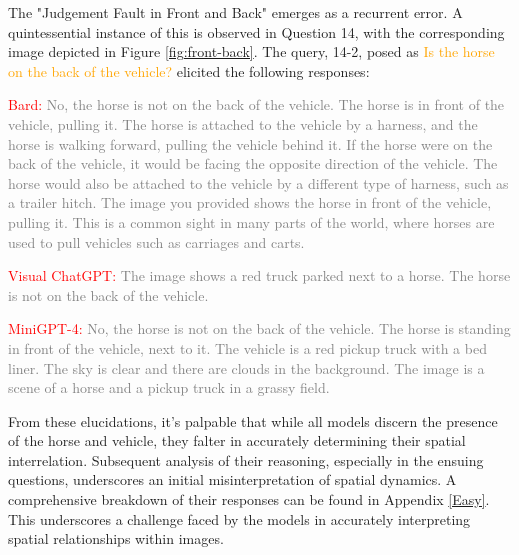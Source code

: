 \documentclass[journal,10pt]{IEEEtran}
\begin{document}
The "Judgement Fault in Front and Back" emerges as a recurrent error. A quintessential instance of this is observed in Question 14, with the corresponding image depicted in Figure \ref{fig:front-back}. The query, 14-2, posed as \textcolor{orange}{Is the horse on the back of the vehicle?} elicited the following responses:

\textcolor{red}{Bard:} \textcolor{gray}{No, the horse is not on the back of the vehicle. The horse is in front of the vehicle, pulling it. The horse is attached to the vehicle by a harness, and the horse is walking forward, pulling the vehicle behind it. If the horse were on the back of the vehicle, it would be facing the opposite direction of the vehicle. The horse would also be attached to the vehicle by a different type of harness, such as a trailer hitch. The image you provided shows the horse in front of the vehicle, pulling it. This is a common sight in many parts of the world, where horses are used to pull vehicles such as carriages and carts.}

\textcolor{red}{Visual ChatGPT:} \textcolor{gray}{The image shows a red truck parked next to a horse. The horse is not on the back of the vehicle.}

\textcolor{red}{MiniGPT-4:} \textcolor{gray}{No, the horse is not on the back of the vehicle. The horse is standing in front of the vehicle, next to it. The vehicle is a red pickup truck with a bed liner. The sky is clear and there are clouds in the background. The image is a scene of a horse and a pickup truck in a grassy field.}

From these elucidations, it's palpable that while all models discern the presence of the horse and vehicle, they falter in accurately determining their spatial interrelation. Subsequent analysis of their reasoning, especially in the ensuing questions, underscores an initial misinterpretation of spatial dynamics. A comprehensive breakdown of their responses can be found in Appendix \ref{Easy}. This underscores a challenge faced by the models in accurately interpreting spatial relationships within images.
\end{document}
